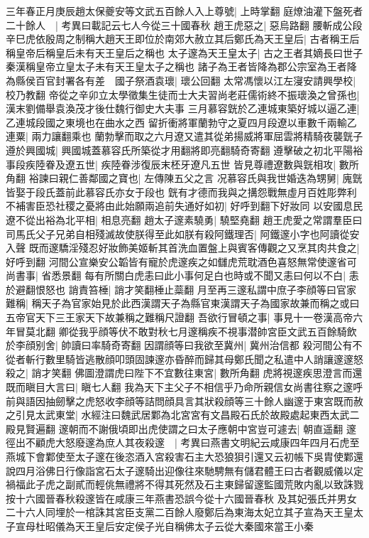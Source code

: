 三年春正月庚辰趙太保夔安等文武五百餘人入上尊號|{
	上時掌翻}
庭燎油灌下盤死者二十餘人　|{
	考異曰載記云七人今從三十國春秋}
趙王虎惡之|{
	惡烏路翻}
腰斬成公段辛巳虎依殷周之制稱大趙天王即位於南郊大赦立其后鄭氏為天王皇后|{
	古者稱王后稱皇帝后稱皇后未有天王皇后之稱也}
太子邃為天王皇太子|{
	古之王者其嫡長曰世子秦漢稱皇帝立皇太子未有天王皇太子之稱也}
諸子為王者皆降為郡公宗室為王者降為縣侯百官封署各有差　國子祭酒袁瓌|{
	瓌公回翻}
太常馮懷以江左寖安請興學校|{
	校乃教翻}
帝從之辛卯立太學徵集生徒而士大夫習尚老莊儒術終不振瓌渙之曾孫也|{
	漢末劉備舉袁渙茂才後仕魏行御史大夫事}
三月慕容皝於乙連城東築好城以逼乙連|{
	乙連城段國之東境也在曲水之西}
留折衝將軍蘭勃守之夏四月段遼以車數千兩輸乙連粟|{
	兩力讓翻乘也}
蘭勃擊而取之六月遼又遣其從弟揚威將軍屈雲將精騎夜襲皝子遵於興國城|{
	興國城蓋慕容氏所築從才用翻將即亮翻騎奇寄翻}
遵擊破之初北平陽裕事段疾陸眷及遼五世|{
	疾陸眷涉復辰末柸牙遼凡五世}
皆見尊禮遼數與皝相攻|{
	數所角翻}
裕諫曰親仁善鄰國之寶也|{
	左傳陳五父之言}
况慕容氏與我世婚迭為甥舅|{
	廆皝皆娶于段氏蓋前此慕容氏亦女于段也}
皝有才德而我與之搆怨戰無虛月百姓彫弊利不補害臣恐社稷之憂將由此始願兩追前失通好如初|{
	好呼到翻下好妝同}
以安國息民遼不從出裕為北平相|{
	相息亮翻}
趙太子邃素驍勇|{
	驍堅堯翻}
趙王虎愛之常謂羣臣曰司馬氏父子兄弟自相殘滅故使朕得至此如朕有殺阿鐵理否|{
	阿鐵邃小字也阿讀從安入聲}
既而邃驕淫殘忍好妝飾美姬斬其首洗血置盤上與賓客傳觀之又烹其肉共食之|{
	好呼到翻}
河間公宣樂安公韜皆有寵於虎邃疾之如讎虎荒耽酒色喜怒無常使邃省可尚書事|{
	省悉景翻}
每有所關白虎恚曰此小事何足白也時或不聞又恚曰何以不白|{
	恚於避翻恨怒也}
誚責笞棰|{
	誚才笑翻棰止蘂翻}
月至再三邃私謂中庶子李顔等曰官家難稱|{
	稱天子為官家始見於此西漢謂天子為縣官東漢謂天子為國家故兼而稱之或曰五帝官天下三王家天下故兼稱之難稱尺證翻}
吾欲行冒頓之事|{
	事見十一卷漢高帝六年冒莫北翻}
卿從我乎顔等伏不敢對秋七月邃稱疾不視事潜帥宮臣文武五百餘騎飲於李顔别舍|{
	帥讀曰率騎奇寄翻}
因謂顔等曰我欲至冀州|{
	冀州治信都}
殺河間公有不從者斬行數里騎皆逃散顔叩頭固諫邃亦昏醉而歸其母鄭氏聞之私遣中人誚讓邃邃怒殺之|{
	誚才笑翻}
佛圖澄謂虎曰陛下不宜數往東宮|{
	數所角翻}
虎將視邃疾思澄言而還既而瞋目大言曰|{
	瞋七人翻}
我為天下主父子不相信乎乃命所親信女尚書往察之邃呼前與語因抽劒擊之虎怒收李顔等詰問顔具言其狀殺顔等三十餘人幽邃于東宮既而赦之引見太武東堂|{
	水經注曰魏武居鄴為北宮宮有文昌殿石氏於故殿處起東西太武二殿見賢遍翻}
邃朝而不謝俄頃即出虎使謂之曰太子應朝中宮豈可遽去|{
	朝直遥翻}
邃徑出不顧虎大怒廢邃為庶人其夜殺邃　|{
	考異曰燕書文明紀云咸康四年四月石虎至燕城下會鄴使至太子邃在後恣酒入宮殺害石主大恐狼狽引還又云初帳下吳胄使鄴還說四月浴佛日行像詣宮石太子邃騎出迎像往來馳騁無有儲君體王曰古者觀威儀以定禍福此子虎之副貳而輕佻無禮將不得其死然及石主東歸留邃監國荒敗内亂以致誅戮按十六國晉春秋殺邃皆在咸康三年燕書恐誤今從十六國晉春秋}
及其妃張氏并男女二十六人同埋於一棺誅其宮臣支黨二百餘人廢鄭后為東海太妃立其子宣為天王皇太子宣母杜昭儀為天王皇后安定侯子光自稱佛太子云從大秦國來當王小秦

